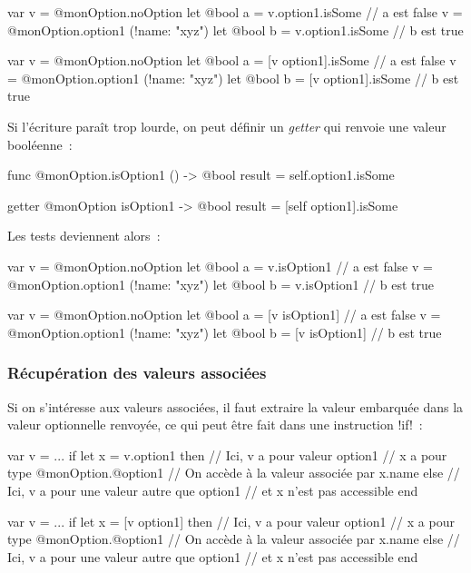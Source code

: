 \begin{galgas4}
var v = @monOption.noOption
let @bool a = v.option1.isSome // a est false
v = @monOption.option1 (!name: "xyz")
let @bool b = v.option1.isSome // b est true
\end{galgas4}
\begin{galgas3}
var v = @monOption.noOption
let @bool a = [v option1].isSome // a est false
v = @monOption.option1 (!name: "xyz")
let @bool b = [v option1].isSome // b est true
\end{galgas3}

Si l'écriture paraît trop lourde, on peut définir un \emph{getter} qui renvoie une valeur booléenne~:
\begin{galgas4}
func @monOption.isOption1 () -> @bool {
  result = self.option1.isSome
}
\end{galgas4}
\begin{galgas3}
getter @monOption isOption1 -> @bool {
  result = [self option1].isSome
}
\end{galgas3}

Les tests deviennent alors~:
\begin{galgas4}
var v = @monOption.noOption
let @bool a = v.isOption1 // a est false
v = @monOption.option1 (!name: "xyz")
let @bool b = v.isOption1 // b est true
\end{galgas4}
\begin{galgas3}
var v = @monOption.noOption
let @bool a = [v isOption1] // a est false
v = @monOption.option1 (!name: "xyz")
let @bool b = [v isOption1] // b est true
\end{galgas3}




\subsubsection{Récupération des valeurs associées}

Si on s'intéresse aux valeurs associées, il faut extraire la valeur embarquée dans la valeur optionnelle renvoyée, ce qui peut être fait dans une instruction \ggsq!if!~:

\begin{galgas4}
var v = ...
if let x = v.option1 then
  // Ici, v a pour valeur option1
  // x a pour type @monOption.@option1
  // On accède à la valeur associée par x.name
else
  // Ici, v a pour une valeur autre que option1
  // et x n'est pas accessible
end
\end{galgas4}

\begin{galgas3}
var v = ...
if let x = [v option1] then
  // Ici, v a pour valeur option1
  // x a pour type @monOption.@option1
  // On accède à la valeur associée par x.name
else
  // Ici, v a pour une valeur autre que option1
  // et x n'est pas accessible
end
\end{galgas3}


















